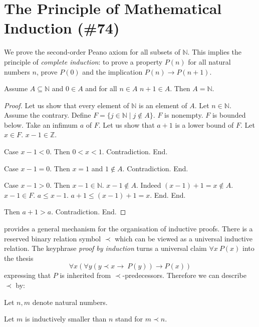 \documentclass{article}
\begin{document}
\section{The Principle of Mathematical Induction (\#74)}

We prove the second-order Peano axiom for all subsets of $\mathbb{N}$.
This implies the principle of {\em complete induction}: to prove a
property $P(n)$ for all natural numbers $n$, prove $P(0)$ and
the implication $P(n) \rightarrow P(n+1)$.
%
\begin{forthel}

\begin{theorem}
Assume $A \subseteq \mathbb{N}$
and $0 \in A$ and for all $n \in A$ $n + 1 \in A$.
Then $A = \mathbb{N}$.
\end{theorem}

\begin{proof}
Let us show that every element of $\mathbb{N}$ is an element of $A$.
  Let $n \in \mathbb{N}$.
  Assume the contrary.
  Define $F = \{  j \in \mathbb{N} \mid j \notin A\}$.
  $F$ is nonempty. $F$ is bounded below.
  Take an infimum $a$ of $F$.
  Let us show that $a+1$ is a lower bound of $F$.
    Let $x \in F$. $x - 1 \in \mathbb{Z}$.

    Case $x - 1 < 0$. Then $0 < x < 1$. Contradiction. End.

    Case $x - 1 = 0$. Then $x = 1$ and $1 \notin A$. Contradiction. End.

    Case $x - 1 > 0$. Then $x - 1 \in \mathbb{N}$.
      $x - 1 \notin A$. Indeed $(x - 1) + 1 = x \notin A$. $x - 1 \in F$.
      $a \leq x - 1$.
      $a + 1 \leq (x - 1) + 1 = x$.
    End.
  End.

  Then $a+1 > a$.
  Contradiction.
End.
\end{proof}
\end{forthel}
%
\Naproche provides a general mechanism for the organisation of
inductive proofs. There is a reserved binary relation
symbol $\prec$ which can be viewed as a universal inductive relation.
The keyphrase {\em proof by induction} turns a universal
claim $\forall x \ P(x)$ into the thesis
$$\forall x (\forall y (y \prec x \rightarrow \ P(y)) \rightarrow P(x))$$
expressing that $P$ is inherited from $\prec$-predecessors.
Therefore we can describe $\prec$ by:
%
\begin{forthel}
Let $n,m$ denote natural numbers.

Let $m$ is inductively smaller than $n$ stand for $m \prec n$.
\end{forthel}
\end{document}
